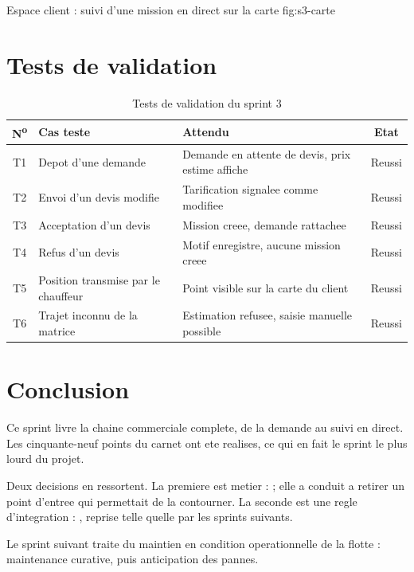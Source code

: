   {Espace client : suivi d'une mission en direct sur la carte}
  {fig:s3-carte}

\section{Tests de validation}

\begin{table}[H]
\centering
\caption{Tests de validation du sprint 3}
\label{tab:tests-s3}
\small
\begin{tabularx}{\textwidth}{@{}cXp{2.9cm}c@{}}
\toprule
\textbf{N\textsuperscript{o}} & \textbf{Cas teste} & \textbf{Attendu} &
\textbf{Etat} \\ \midrule
T1 & Depot d'une demande & Demande en attente de devis, prix estime affiche & Reussi \\
T2 & Envoi d'un devis modifie & Tarification signalee comme modifiee & Reussi \\
T3 & Acceptation d'un devis & Mission creee, demande rattachee & Reussi \\
T4 & Refus d'un devis & Motif enregistre, aucune mission creee & Reussi \\
T5 & Position transmise par le chauffeur & Point visible sur la carte du client & Reussi \\
T6 & Trajet inconnu de la matrice & Estimation refusee, saisie manuelle possible & Reussi \\
\bottomrule
\end{tabularx}
\end{table}

\section*{Conclusion}

Ce sprint livre la chaine commerciale complete, de la demande au suivi en
direct. Les cinquante-neuf points du carnet ont ete realises, ce qui en
fait le sprint le plus lourd du projet.

Deux decisions en ressortent. La premiere est metier :  ;
elle a conduit a retirer un point d'entree qui permettait de la
contourner. La seconde est une regle d'integration : , reprise telle quelle par les sprints suivants.

Le sprint suivant traite du maintien en condition operationnelle de la
flotte : maintenance curative, puis anticipation des pannes.
